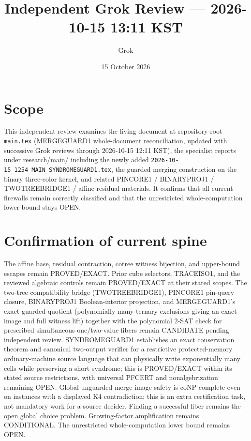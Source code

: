 \documentclass[11pt]{article}
\title{Independent Grok Review --- 2026-10-15 13:11 KST}
\author{Grok}
\date{15 October 2026}
\begin{document}
\maketitle

\begin{center}
\end{center}

\section{Scope}
This independent review examines the living document at repository-root \texttt{main.tex} (MERGEGUARD1 whole-document reconciliation, updated with successive Grok reviews through 2026-10-15 12:11 KST), the specialist reports under research/main/ including the newly added \texttt{2026-10-15_1254_MAIN_SYNDROMEGUARD1.tex}, the guarded merging construction on the binary three-color kernel, and related PINCORE1 / BINARYPROJ1 / TWOTREEBRIDGE1 / affine-residual materials. It confirms that all current firewalls remain correctly classified and that the unrestricted whole-computation lower bound stays OPEN.

\section{Confirmation of current spine}
The affine base, residual contraction, cotree witness bijection, and upper-bound escapes remain PROVED/EXACT. Prior cube selectors, TRACEISO1, and the reviewed algebraic controls remain PROVED/EXACT at their stated scopes. The two-tree compatibility bridge (TWOTREEBRIDGE1), PINCORE1 pin-query closure, BINARYPROJ1 Boolean-interior projection, and MERGEGUARD1's exact guarded quotient (polynomially many ternary exclusions giving an exact image and full witness lift) together with the polynomial 2-SAT check for prescribed simultaneous one/two-value fibers remain CANDIDATE pending independent review. SYNDROMEGUARD1 establishes an exact conservation theorem and canonical two-output verifier for a restrictive protected-memory ordinary-machine source language that can physically write exponentially many cells while preserving a short syndrome; this is PROVED/EXACT within its stated source restrictions, with universal PFCERT and nonalgebrization remaining OPEN. Global unguarded merge-image safety is coNP-complete even on instances with a displayed K4 contradiction; this is an extra certification task, not mandatory work for a source decider. Finding a successful fiber remains the open global choice problem. Growing-factor amplification remains CONDITIONAL. The unrestricted whole-computation lower bound remains OPEN.
\end{document}
